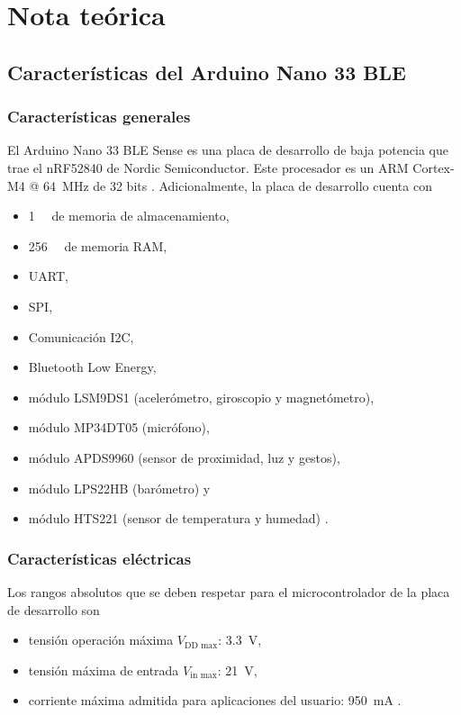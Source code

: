 \section{Nota teórica}
\subsection{Características del Arduino Nano 33 BLE}
\subsubsection{Características generales}
El Arduino Nano 33 BLE Sense es una placa de desarrollo de baja potencia que trae el nRF52840 de Nordic Semiconductor. Este procesador es un ARM Cortex-M4 @ \SI{64}{\mega\hertz} de 32 bits \cite{nano33, nrf}. Adicionalmente, la placa de desarrollo cuenta con
\begin{itemize}
    \item \SI{1}{\mega\byte} de memoria de almacenamiento,
    \item \SI{256}{\kilo\byte} de memoria RAM,
    \item UART,
    \item SPI,
    \item Comunicación I2C,
    \item Bluetooth Low Energy,
    \item módulo LSM9DS1 (acelerómetro, giroscopio y magnetómetro),
    \item módulo MP34DT05 (micrófono),
    \item módulo APDS9960 (sensor de proximidad, luz y gestos),
    \item módulo LPS22HB (barómetro) y
    \item módulo HTS221 (sensor de temperatura y humedad) \cite{nano33}.
\end{itemize}

\subsubsection{Características eléctricas}
Los rangos absolutos que se deben respetar para el microcontrolador de la placa de desarrollo son
\begin{itemize}
    \item tensión operación máxima $V_\text{DD max}$: \SI{3.3}{\volt},
    \item tensión máxima de entrada $V_\text{in max}$: \SI{21}{\volt},
    \item corriente máxima admitida para aplicaciones del usuario: \SI{950}{\milli\ampere} \cite{nano33}.
\end{itemize}
    

